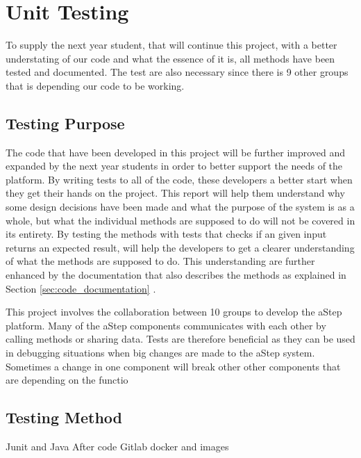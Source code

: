 \section{Unit Testing}
To supply the next year student, that will continue this project, with a better understating of our code and what the essence of it is, all methods have been tested and documented. 
The test are also necessary since there is 9 other groups that is depending our code to be working.

\subsection{Testing Purpose}
The code that have been developed in this project will be further improved and expanded by the next year students in order to better support the needs of the platform. 
By writing tests to all of the code, these developers a better start when they get their hands on the project. 
This report will help them understand why some design decisions have been made and what the purpose of the system is as a whole, but what the individual methods are supposed to do will not be covered in its entirety. 
By testing the methods with tests that checks if an given input returns an expected result, will help the developers to get a clearer understanding of what the methods are supposed to do. 
This understanding are further enhanced by the documentation that also describes the methods as explained in Section \ref{sec:code_documentation} . 

This project involves the collaboration between 10 groups to develop the aStep platform. 
Many of the aStep components communicates with each other by calling methods or sharing data.
Tests are therefore beneficial as they can be used in debugging situations when big changes are made to the aStep system. 
Sometimes a change in one component will break other other components that are depending on the functio





\subsection{Testing Method}
Junit and Java
After code
Gitlab docker and images


